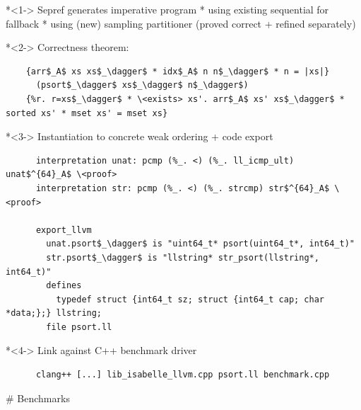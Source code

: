 \documentclass[fleqn]{beamer}
\begin{document}
  *<1-> Sepref generates imperative program
    * using existing sequential  for fallback
    * using (new) sampling partitioner (proved correct + refined separately)

  *<2-> Correctness theorem:
    {
    \begin{lstlisting}
    {arr$_A$ xs xs$_\dagger$ * idx$_A$ n n$_\dagger$ * n = |xs|}
      (psort$_\dagger$ xs$_\dagger$ n$_\dagger$)
    {%r. r=xs$_\dagger$ * \<exists> xs'. arr$_A$ xs' xs$_\dagger$ * sorted xs' * mset xs' = mset xs}
    \end{lstlisting}}
  *<3-> Instantiation to concrete weak ordering + code export
    {
    \begin{lstlisting}
      interpretation unat: pcmp (%_. <) (%_. ll_icmp_ult) unat$^{64}_A$ \<proof>
      interpretation str: pcmp (%_. <) (%_. strcmp) str$^{64}_A$ \<proof>

      export_llvm
        unat.psort$_\dagger$ is "uint64_t* psort(uint64_t*, int64_t)"
        str.psort$_\dagger$ is "llstring* str_psort(llstring*, int64_t)"
        defines
          typedef struct {int64_t sz; struct {int64_t cap; char *data;};} llstring;
        file psort.ll
    \end{lstlisting}}

  *<4-> Link against C++ benchmark driver
    \begin{lstlisting}
      clang++ [...] lib_isabelle_llvm.cpp psort.ll benchmark.cpp
    \end{lstlisting}


# Benchmarks
\end{document}
